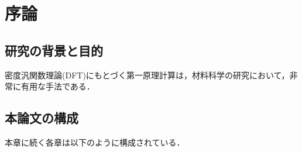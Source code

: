 \documentclass[main]{subfiles}
\begin{document}
\chapter{序論}
\section{研究の背景と目的}
密度汎関数理論(DFT)にもとづく第一原理計算は，材料科学の研究において，非常に有用な手法である．
\section{本論文の構成}
本章に続く各章は以下のように構成されている．
\end{document}
